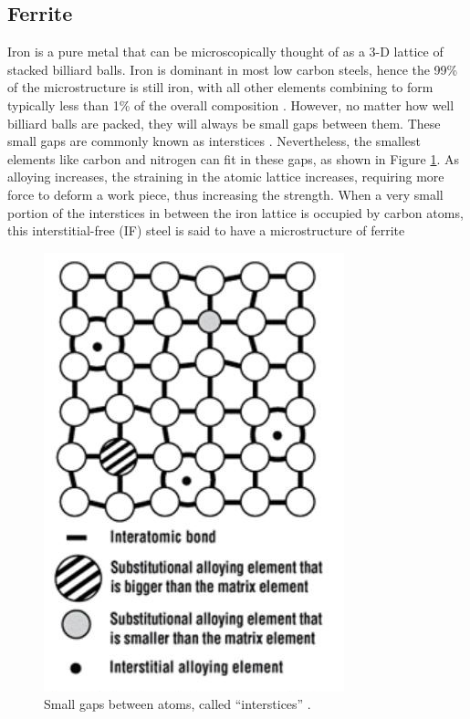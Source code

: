 \documentclass[12pt]{report}
\begin{document}
\subsection{Ferrite} 
Iron is a pure metal that can be microscopically thought of as a 3-D lattice of stacked billiard balls. Iron is dominant in most low carbon steels, hence the 99\% of the microstructure is still iron, with all other elements combining to form typically less than 1\% of the overall composition \cite{bajaj2020steels}. However, no matter how well billiard balls are packed, they will always be small gaps between them. These small gaps are commonly known as interstices \cite{bajaj2020steels}. Nevertheless, the smallest elements like carbon and nitrogen can fit in these gaps, as shown in Figure \ref{ch3:figure:gaps}. As alloying increases, the straining in the atomic lattice increases, requiring more force to deform a work piece, thus increasing the strength. When a very small portion of the interstices in between the iron lattice is occupied by carbon atoms, this interstitial-free (IF) steel is said to have a microstructure of ferrite \cite{bhadeshia2017steels}
 
\begin{figure}[H]
    \centering
    \includegraphics[width=.5\textwidth]{small_gaps_between_atoms.jpg}
    \caption{Small gaps between atoms, called “interstices” \cite{bajaj2020steels}.}
    \label{ch3:figure:gaps}
\end{figure}
\end{document}
